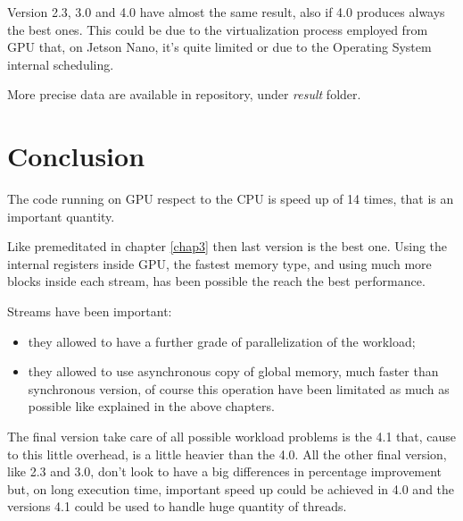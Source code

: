 Version 2.3, 3.0 and 4.0 have almost the same result, also if 4.0 produces always the best ones. This could be due to 
the virtualization process employed from GPU that, on Jetson Nano, it's quite limited or due to the Operating System internal 
scheduling.

More precise data are available in repository, under \emph{result} folder.

\section{Conclusion}

The code running on GPU respect to the CPU is speed up of 14 times, that is an important quantity.

Like premeditated in chapter \ref{chap3} then last version is the best one. Using the internal registers inside GPU,
the fastest memory type, and using much more blocks inside each stream, has been possible the reach the best performance.

Streams have been important:
\begin{itemize}
    \item they allowed to have a further grade of parallelization of the workload;
    \item they allowed to use asynchronous copy of global memory, much faster than synchronous version, of course this operation 
    have been limitated as much as possible like explained in the above chapters.
\end{itemize}

The final version take care of all possible workload problems is the 4.1 that, cause to this little overhead,
is a little heavier than the 4.0. All the other final version, like 2.3 and 3.0, don't look to have a big 
differences in percentage improvement but, on long execution time, important speed up could be achieved in 4.0 and
the versions 4.1 could be used to handle huge quantity of threads.
